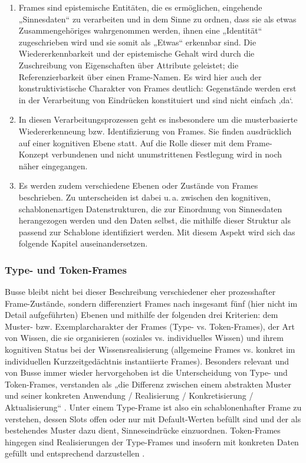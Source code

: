 \begin{enumerate}
\def\labelenumi{\arabic{enumi})}
\item
  Frames sind epistemische Entitäten, die es ermöglichen, eingehende „Sinnesdaten`` zu verarbeiten und in dem Sinne zu ordnen, dass sie als etwas Zusammengehöriges wahrgenommen werden, ihnen eine „Identität`` zugeschrieben wird und sie somit als „Etwas`` erkennbar sind. Die Wiedererkennbarkeit und der epistemische Gehalt wird durch die Zuschreibung von Eigenschaften über Attribute geleistet; die Referenzierbarkeit über einen Frame-Namen. Es wird hier auch der konstruktivistische Charakter von Frames deutlich: Gegenstände werden erst in der Verarbeitung von Eindrücken konstituiert und sind nicht einfach ‚da`.
\item
  In diesen Verarbeitungsprozessen geht es insbesondere um die musterbasierte Wiedererkenneung bzw. Identifizierung von Frames. Sie finden ausdrücklich auf einer kognitiven Ebene statt. Auf die Rolle dieser mit dem Frame-Konzept verbundenen und nicht unumstrittenen Festlegung wird in  noch näher eingegangen.
\item
  Es werden zudem verschiedene Ebenen oder Zustände von Frames beschrieben. Zu unterscheiden ist dabei u.\,a. zwischen den kognitiven, schablonenartigen Datenstrukturen, die zur Einordnung von Sinnesdaten herangezogen werden und den Daten selbst, die mithilfe dieser Struktur als passend zur Schablone identifiziert werden. Mit diesem Aspekt wird sich das folgende Kapitel auseinandersetzen.
\end{enumerate}

\subsubsection{Type- und Token-Frames}\label{type--und-token-frames}

Busse bleibt nicht bei dieser Beschreibung verschiedener eher prozesshafter Frame-Zustände, sondern differenziert Frames nach insgesamt fünf (hier nicht im Detail aufgeführten) Ebenen und mithilfe der folgenden drei Kriterien: dem Muster- bzw. Exemplarcharakter der Frames (Type- vs. Token-Frames), der Art von Wissen, die sie organisieren (soziales vs. individuelles Wissen) und ihrem kognitiven Status bei der Wissensrealisierung (allgemeine Frames vs. konkret im individuellen Kurzzeitgedächtnis instantiierte Frames). Besonders relevant und von Busse immer wieder hervorgehoben ist die Unterscheidung von Type- und Token-Frames, verstanden als „die Differenz zwischen einem abstrakten Muster und seiner konkreten Anwendung / Realisierung / Konkretisierung / Aktualisierung`` \autocite*[614]{busseFrameSemantikKompendium2012}. Unter einem Type-Frame ist also ein schablonenhafter Frame zu verstehen, dessen Slots offen oder nur mit Default-Werten befüllt sind und der als bestehendes Muster dazu dient, Sinneseindrücke einzuordnen. Token-Frames hingegen sind Realisierungen der Type-Frames und insofern mit konkreten Daten gefüllt und entsprechend darzustellen \autocite[539]{busseFrameSemantikKompendium2012}.

